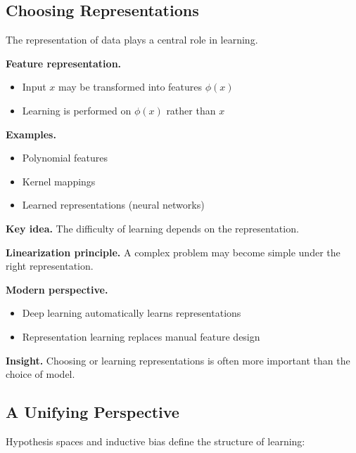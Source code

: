 \subsection{Choosing Representations}

The representation of data plays a central role in learning.

\medskip

\noindent
\textbf{Feature representation.}
\begin{itemize}
    \item Input $x$ may be transformed into features $\phi(x)$
    \item Learning is performed on $\phi(x)$ rather than $x$
\end{itemize}

\medskip

\noindent
\textbf{Examples.}
\begin{itemize}
    \item Polynomial features
    \item Kernel mappings
    \item Learned representations (neural networks)
\end{itemize}

\medskip

\noindent
\textbf{Key idea.}  
The difficulty of learning depends on the representation.

\medskip

\noindent
\textbf{Linearization principle.}  
A complex problem may become simple under the right representation.

\medskip

\noindent
\textbf{Modern perspective.}
\begin{itemize}
    \item Deep learning automatically learns representations
    \item Representation learning replaces manual feature design
\end{itemize}

\medskip

\noindent
\textbf{Insight.}  
Choosing or learning representations is often more important than the choice of model.

\subsection{A Unifying Perspective}

Hypothesis spaces and inductive bias define the structure of learning:

